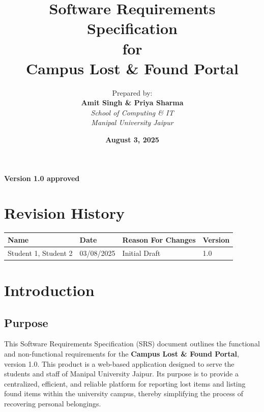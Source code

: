 \documentclass[11pt, a4paper]{article}
\title{
    \vspace{2cm} %
    \textbf{\huge Software Requirements Specification} \\
    \vspace{0.5cm}
    \large for \\
    \vspace{0.5cm}
    \textbf{\Huge Campus Lost \& Found Portal}
    \vspace{2cm}
}
\author{
    Prepared by: \\
    \textbf{Amit Singh \& Priya Sharma} \\
    \textit{School of Computing \& IT} \\
    \textit{Manipal University Jaipur}
}
\date{\textbf{August 3, 2025}}
\begin{document}
\begin{titlepage}
    \maketitle
    \vfill
    \begin{center}
        \textbf{Version 1.0 approved}
    \end{center}
\end{titlepage}

\tableofcontents
\newpage

\section*{Revision History}
\begin{tabular}{|m{4cm}|m{3cm}|m{6cm}|m{2cm}|}
    \hline
    \textbf{Name} & \textbf{Date} & \textbf{Reason For Changes} & \textbf{Version} \\
    \hline
    Student 1, Student 2 & 03/08/2025 & Initial Draft & 1.0 \\
    \hline
\end{tabular}
\newpage


\section{Introduction}

\subsection{Purpose}
This Software Requirements Specification (SRS) document outlines the functional and non-functional requirements for the \textbf{Campus Lost \& Found Portal}, version 1.0. This product is a web-based application designed to serve the students and staff of Manipal University Jaipur. Its purpose is to provide a centralized, efficient, and reliable platform for reporting lost items and listing found items within the university campus, thereby simplifying the process of recovering personal belongings.
\end{document}
